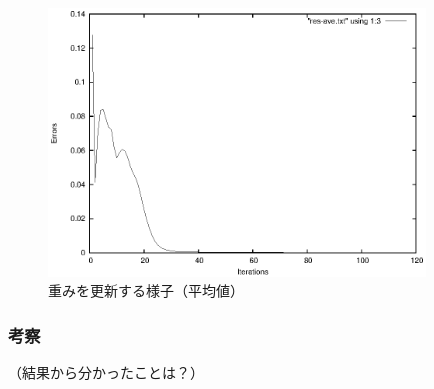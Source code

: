 \begin{figure}[h]
 \begin{center}
  \includegraphics[width=10.0cm]{figs/sample2.eps}
  \caption{重みを更新する様子（平均値）}
  \label{fig:level1-2}
 \end{center}
\end{figure}


\subsubsection{考察}
（結果から分かったことは？）



